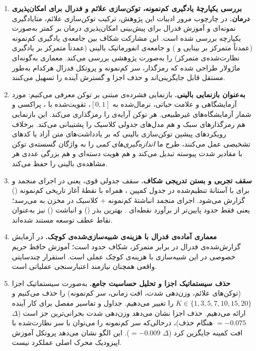 \begin{enumerate}
\item \textbf{بررسی یکپارچۀ یادگیری کم‌نمونه، توکن‌سازی علائم و فدرال برای امکان‌پذیری درمان.} در چارچوب مرور ادبیات این پژوهش، ترکیب توکن‌سازی علائم، متایادگیری نمونه‌ای و آموزش فدرال برای پیش‌بینی امکان‌پذیری درمان بر  کمتر به‌صورت یکپارچه بررسی شده است. این مشارکت شکاف بین جامعه‌ی یادگیری کم‌نمونه (عمدتاً متمرکز بر بینایی و ) و جامعه‌ی انفورماتیک بالینی (عمدتاً متمرکز بر یادگیری نظارت‌شده‌ی متمرکز) را به‌صورت پژوهشی بررسی می‌کند. معماری به‌گونه‌ای ماژولار طراحی شده که رمزگذار، سر کم‌نمونه و پروتکل فدرال هرکدام به‌طور مستقل قابل جایگزینی‌اند و حذف اجزا و گسترش آینده را تسهیل می‌کنند.

\item \textbf{ به‌عنوان بازنمایی بالینی.} بازنمایی فشرده‌ی مبتنی بر توکن معرفی می‌کنیم:  مورد آزمایشگاهی و  علامت حیاتی، نرمال‌شده به $[0,1]$، تقویت‌شده با ، پراکسی  و شمار آزمایشگاه‌های غیرطبیعی. هر توکن آرایه‌ی  را رمزگذاری می‌کند. این بازنمایی هم رمزگذارهای سبک  و هم مدل‌های جدولی کلاسیک را پشتیبانی می‌کند. برخلاف رویکردهای پیشین توکن‌سازی بالینی که بر یادداشت‌های متن آزاد یا کدهای تشخیصی عمل می‌کنند، طرح ما \emph{اندازه‌گیری‌های کمی} را به واژگان گسسته‌ی توکن با مقادیر شدت پیوسته تبدیل می‌کند و هم هویت دسته‌ای و هم بزرگی عددی هر مشاهده‌ی بالینی را حفظ می‌کند.

\item \textbf{سقف تجربی و بستن تدریجی شکاف.} سقف جدولی قوی، یعنی \textbf{ } در اجرای منجمد  و  برای  با آستانۀ تنظیم‌شده در جدول کمپین ، همراه با نقطۀ آغاز تاریخی کم‌نمونه (\textbf{}) گزارش می‌شود. اجرای منجمد انباشتۀ کم‌نمونه + کلاسیک در مخزن به \textbf{} \cnum{[0.699, 0.797]} می‌رسد؛ یعنی فقط حدود \textbf{} پایین‌تر از برآورد نقطه‌ای . بهترین بذر  (\textbf{}) و انباشت  (\textbf{}) نیز به‌عنوان نقاط عطف توسعه مستند شده‌اند.

\item \textbf{معماری آماده‌ی فدرال با هزینه‌ی شبیه‌سازی‌شده‌ی کوچک.} در آزمایش گزارش‌شده‌ی فدرال در برابر متمرکز، شکاف  حدود \textbf{} است؛ آموزش حافظ حریم خصوصی در این شبیه‌سازی با هزینه‌ی کوچک عملی است. استقرار چندسایتی واقعی همچنان نیازمند اعتبارسنجی عملیاتی است.

\item \textbf{حذف سیستماتیک اجزا و تحلیل حساسیت جامع.} به‌صورت سیستماتیک اجزا (توکن‌های علائم، وزن‌دهی شدت، افت زمانی، سر کم‌نمونه) را حذف می‌کنیم و $K \in \{1,3,5,7,10,15,20\}$ را تغییر می‌دهیم. جداول و تفاسیر مفصل برای کار آینده ارائه می‌دهیم. حذف اجزا نشان می‌دهد وزن‌دهی شدت بحرانی‌ترین جز است ($\Delta$ $= -0.075$ هنگام حذف)، درحالی‌که سر کم‌نمونه را می‌توان با سر نظارت‌شده با افت کمینه جایگزین کرد ($\Delta$ $= -0.009$). این الگو نشان می‌دهد پروتکل آموزش اپیزودیک محرک اصلی عملکرد نیست.


\end{enumerate}
